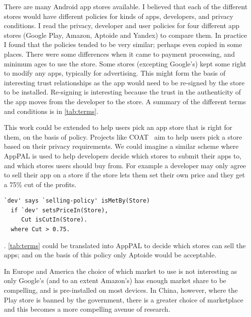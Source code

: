 \documentclass[a4paper]{scrartcl}
\begin{document}
There are many Android app stores available.
I believed that each of the different stores would have different policies for kinds of apps, developers, and privacy conditions.
I read the privacy, developer and user policies for four different app stores (Google Play, Amazon, Aptoide and Yandex) to compare them.
In practice I found that the policies tended to be very similar; perhaps even copied in some places.
There were some differences when it came to payment processing, and minimum ages to use the store.
Some stores (excepting Google's) kept some right to modify any apps, typically for advertising.
This might form the basis of interesting trust relationships as the app would need to be re-signed by the store to be installed.
Re-signing is interesting because the trust in the authenticity of the app moves from the developer to the store.
A summary of the different terms and conditions is in \autoref{tab:terms}.

This work could be extended to help users pick an app store that is right for them, on the basis of policy.
Projects like COAT~\citep{Fernandez:5lFoplRA} aim to help users pick a store based on their privacy requirements.
We could imagine a similar scheme where AppPAL is used to help developers decide which stores to submit their apps to,
  and which stores users should buy from.
For example a developer may only agree to sell their app on a store if the store lets them set their own price and they get a 75\% cut of the profits.
\begin{lstlisting}
`dev' says `selling-policy' isMetBy(Store)
  if `dev' setsPriceIn(Store),
     Cut isCutIn(Store).
  where Cut > 0.75.
\end{lstlisting}.
\autoref{tab:terms} could be translated into AppPAL to decide which stores can sell the apps; and on the basis of this policy only Aptoide would be acceptable.

In Europe and America the choice of which market to use is not interesting as only Google's (and to an extent Amazon's) has enough market share to be compelling, and is pre-installed on most devices.
In China, however, where the Play store is banned by the government, there is a greater choice of marketplace and this becomes a more compelling avenue of research.
\end{document}
